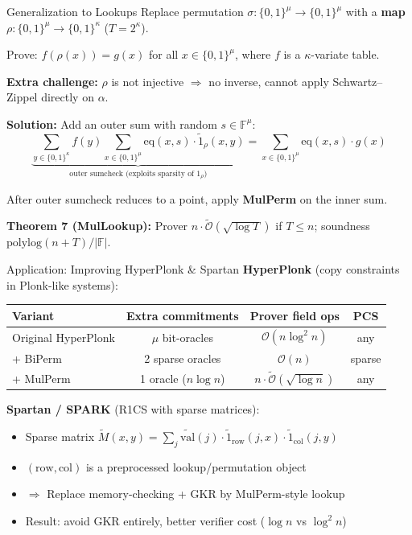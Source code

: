 \documentclass[aspectratio=169,10pt]{beamer}
\newcommand{\F}{\mathbb{F}}
\newcommand{\B}{\{0,1\}}
\newcommand{\eq}{\mathrm{eq}}
\newcommand{\wt}[1]{\widetilde{#1}}
\newcommand{\bigO}{\mathcal{O}}
\newcommand{\polylog}{\mathrm{polylog}}
\begin{document}
\begin{frame}{Generalization to Lookups}
Replace permutation $\sigma : \B^\mu \to \B^\mu$ with a \textbf{map} $\rho : \B^\mu \to \B^\kappa$ ($T = 2^\kappa$).

Prove: $f(\rho(x)) = g(x)$ for all $x \in \B^\mu$, where $f$ is a $\kappa$-variate table.

\vspace{0.5em}
\textbf{Extra challenge:} $\rho$ is not injective $\Rightarrow$ no inverse, cannot apply Schwartz--Zippel directly on $\alpha$.

\vspace{0.3em}
\textbf{Solution:} Add an outer sum with random $s \in \F^\mu$:
\[
  \underbrace{\sum_{y \in \B^\kappa} f(y) \sum_{x \in \B^\mu} \eq(x,s) \cdot \wt{1}_\rho(x,y)}_{\text{outer sumcheck (exploits sparsity of } 1_\rho\text{)}} = \sum_{x \in \B^\mu} \eq(x,s) \cdot g(x)
\]

After outer sumcheck reduces to a point, apply \textbf{MulPerm} on the inner sum.

\vspace{0.3em}
\textbf{Theorem 7 (MulLookup):} Prover $n \cdot \widetilde{\bigO}(\sqrt{\log T})$ if $T \le n$; soundness $\polylog(n+T)/|\F|$.
\end{frame}


\begin{frame}{Application: Improving HyperPlonk \& Spartan}
\textbf{HyperPlonk} (copy constraints in Plonk-like systems):
\begin{center}
\begin{tabular}{lccc}
\toprule
Variant & Extra commitments & Prover field ops & PCS \\
\midrule
Original HyperPlonk & $\mu$ bit-oracles & $\bigO(n \log^2 n)$ & any \\
+ BiPerm & 2 sparse oracles & $\bigO(n)$ & sparse \\
+ MulPerm & 1 oracle ($n\log n$) & $n \cdot \widetilde{\bigO}(\sqrt{\log n})$ & any \\
\bottomrule
\end{tabular}
\end{center}

\vspace{0.6em}
\textbf{Spartan / SPARK} (R1CS with sparse matrices):
\begin{itemize}
  \item Sparse matrix $\wt{M}(x,y) = \sum_j \wt{\mathrm{val}}(j) \cdot \wt{1}_{\mathrm{row}}(j,x) \cdot \wt{1}_{\mathrm{col}}(j,y)$
  \item $(\mathrm{row}, \mathrm{col})$ is a preprocessed lookup/permutation object
  \item $\Rightarrow$ Replace memory-checking + GKR by MulPerm-style lookup
  \item Result: avoid GKR entirely, better verifier cost ($\log n$ vs $\log^2 n$)
\end{itemize}
\end{frame}
\end{document}
